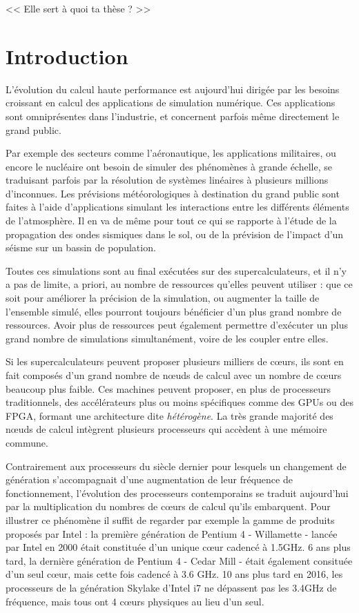 \begin{savequote}[6cm]
<< Elle sert à quoi ta thèse ?  >>

\end{savequote}
\chapter{Introduction}
\chaptertoc

L'évolution du calcul haute performance est aujourd'hui dirigée par les besoins croissant en calcul des applications de simulation numérique.
Ces applications sont omniprésentes dans l'industrie, et concernent parfois même directement le grand public.

Par exemple des secteurs comme l'aéronautique, les applications militaires, ou encore le nucléaire ont besoin de simuler des phénomènes à grande échelle, se traduisant parfois par la résolution de systèmes linéaires à plusieurs millions d'inconnues.
Les prévisions météorologiques à destination du grand public sont faites à l'aide d'applications simulant les interactions entre les différents éléments de l'atmosphère.
Il en va de même pour tout ce qui se rapporte à l'étude de la propagation des ondes sismiques dans le sol, ou de la prévision de l'impact d'un séisme sur un bassin de population.

Toutes ces simulations sont au final exécutées sur des supercalculateurs, et il n'y a pas de limite, a priori, au nombre de ressources qu'elles peuvent utiliser : que ce soit pour améliorer la précision de la simulation, ou augmenter la taille de l'ensemble simulé, elles pourront toujours bénéficier d'un plus grand nombre de ressources.
Avoir plus de ressources peut également permettre d'exécuter un plus grand nombre de simulations simultanément, voire de les coupler entre elles.

Si les supercalculateurs peuvent proposer plusieurs milliers de cœurs, ils sont en fait composés d'un grand nombre de nœuds de calcul avec un nombre de cœurs beaucoup plus faible.
Ces machines peuvent proposer, en plus de processeurs traditionnels, des accélérateurs plus ou moins spécifiques comme des GPUs ou des FPGA, formant une architecture dite \emph{hétérogène}.
La très grande majorité des nœuds de calcul intègrent plusieurs processeurs qui accèdent à une mémoire commune.

Contrairement aux processeurs du siècle dernier pour lesquels un changement de génération s'accompagnait d'une augmentation de leur fréquence de fonctionnement, l'évolution des processeurs contemporains se traduit aujourd'hui par la multiplication du nombres de cœurs de calcul qu'ils embarquent.
Pour illustrer ce phénomène il suffit de regarder par exemple la gamme de produits proposés par Intel : la première génération de Pentium 4 - Willamette - lancée par Intel en 2000 était constituée d'un unique cœur cadencé à 1.5GHz. 6 ans plus tard, la dernière génération de Pentium 4 - Cedar Mill - était également consituée d'un seul cœur, mais cette fois cadencé à 3.6 GHz. 10 ans plus tard en 2016, les processeurs de la génération Skylake d'Intel i7 ne dépassent pas les 3.4GHz de fréquence, mais tous ont 4 cœurs physiques au lieu d'un seul.

